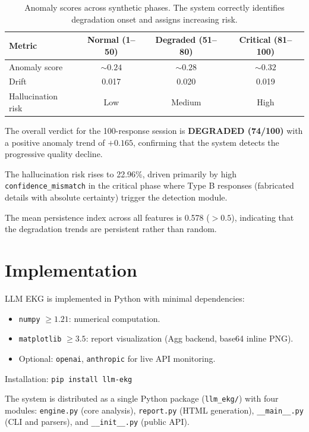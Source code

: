 \documentclass[11pt,a4paper]{article}
\begin{document}
\begin{table}[h]
\centering
\begin{tabular}{lccc}
\toprule
\textbf{Metric} & \textbf{Normal (1--50)} & \textbf{Degraded (51--80)} & \textbf{Critical (81--100)} \\
\midrule
Anomaly score & $\sim 0.24$ & $\sim 0.28$ & $\sim 0.32$ \\
Drift & 0.017 & 0.020 & 0.019 \\
Hallucination risk & Low & Medium & High \\
\bottomrule
\end{tabular}
\caption{Anomaly scores across synthetic phases. The system correctly identifies degradation onset and assigns increasing risk.}
\end{table}

The overall verdict for the 100-response session is \textbf{DEGRADED (74/100)} with a positive anomaly trend of $+0.165$, confirming that the system detects the progressive quality decline.

The hallucination risk rises to 22.96\%, driven primarily by high \texttt{confidence\_mismatch} in the critical phase where Type B responses (fabricated details with absolute certainty) trigger the detection module.

The mean persistence index across all features is 0.578 ($> 0.5$), indicating that the degradation trends are persistent rather than random.

\section{Implementation}

LLM EKG is implemented in Python with minimal dependencies:

\begin{itemize}[nosep]
    \item \texttt{numpy} $\geq 1.21$: numerical computation.
    \item \texttt{matplotlib} $\geq 3.5$: report visualization (Agg backend, base64 inline PNG).
    \item Optional: \texttt{openai}, \texttt{anthropic} for live API monitoring.
\end{itemize}

Installation: \texttt{pip install llm-ekg}

The system is distributed as a single Python package (\texttt{llm\_ekg/}) with four modules: \texttt{engine.py} (core analysis), \texttt{report.py} (HTML generation), \texttt{\_\_main\_\_.py} (CLI and parsers), and \texttt{\_\_init\_\_.py} (public API).
\end{document}
